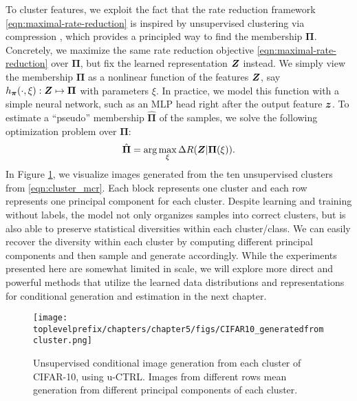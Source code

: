 \documentclass[\toplevelprefix/book-main.tex]{subfiles}
\begin{document}
To cluster features, we exploit the fact that the rate reduction framework \eqref{eqn:maximal-rate-reduction} is inspired by unsupervised clustering via compression \cite{ma2007segmentation}, which provides a principled way to find the membership $\bm \Pi$.
Concretely, we maximize the same rate reduction objective \eqref{eqn:maximal-rate-reduction} over $\bm \Pi$, but fix the learned representation $\bm{Z}$ instead. We simply view the membership $\bm \Pi$ as a nonlinear function of the features $\bm{Z}$, say $h_{\bm \pi}(\cdot,\xi):\bm{Z} \mapsto \bm \Pi$ with parameters $\xi$. In practice, we model this function with a simple neural network, such as an MLP head right after the output feature $\bm{z}$. 
To estimate a ``pseudo'' membership $\hat{\bm \Pi}$ of the samples, we solve the following optimization problem over $\bm \Pi$:
\begin{align}
    \hat{\bm \Pi} = \arg\max_{\xi} \Delta R(\bm{Z}| \bm \Pi(\xi)).
\label{eqn:cluster_mcr}
\end{align}
In Figure \ref{fig:vis_clustering}, we  visualize images generated from the ten unsupervised clusters from \eqref{eqn:cluster_mcr}. Each block represents one cluster and each row represents one principal component for each cluster. Despite learning and training without labels, the model not only organizes samples into correct clusters, but is also able to preserve statistical diversities within each cluster/class. We can easily recover the diversity within each cluster by computing different principal components and then sample and generate accordingly. While the experiments presented here are somewhat limited in scale, we will explore more direct and powerful methods that utilize the learned data distributions and representations for conditional generation and estimation in the next chapter.
\begin{figure}[t]
    \footnotesize
    \centering
    \texttt{[image: \\toplevelprefix/chapters/chapter5/figs/CIFAR10\_generatedfromcluster.png]}
    \caption{\small Unsupervised conditional image generation from each cluster of CIFAR-10, using u-CTRL. Images from different rows mean generation from different principal components of each cluster.}
    \label{fig:vis_clustering}
\end{figure}




\end{document}
